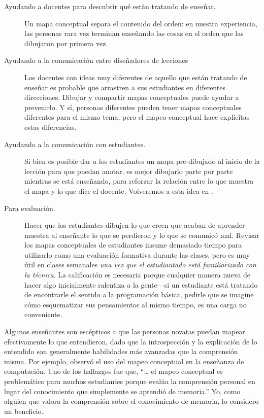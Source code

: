 \begin{description}

\item[Ayudando a docentes para descubrir qué están tratando de enseñar.]
  Un mapa conceptual separa el contenido del orden:
  en nuestra experiencia,
  las personas rara vez terminan enseñando las cosas en el orden que las dibujaron por primera vez.

\item[Ayudando a la comunicación entre diseñadores de lecciones]
  Los docentes con ideas muy diferentes de aquello que están tratando de enseñar es probable que arrastren a sus estudiantes en diferentes direcciones.
  Dibujar y compartir mapas conceptuales puede ayudar a prevenirlo.
  Y sí,
  personas diferentes pueden tener mapas conceptuales diferentes para el mismo tema,
  pero el mapeo conceptual hace explícitas estas diferencias.

\item[Ayudando a la  comunicación con estudiantes.]
  Si bien es posible dar a los estudiantes un mapa pre-dibujado al inicio de la lección para   que puedan anotar,
  es mejor dibujarlo parte por parte mientras se está enseñando,
  para reforzar la relación entre lo que muestra el mapa y lo que dice el docente.
  Volveremos a esta idea en .

\item[Para evaluación.]
  Hacer que los estudiantes dibujen lo que creen que acaban de aprender
  muestra al enseñante lo que se perdieron y lo que se comunicó mal.
  Revisar los mapas conceptuales de estudiantes insume demasiado tiempo para utilizarlo como una evaluación formativa durante las clases,
  pero es muy útil en clases semanales \emph{una vez que el estudiantado está familiarizado con la técnica}.
  La calificación es necesaria porque
  cualquier manera nueva de hacer algo inicialmente ralentiza a la gente---si un estudiante está tratando de encontrarle el sentido a la programación básica,
  pedirle que se imagine cómo esquematizar sus pensamientos al mismo tiempo, es una carga no conveniente.

\end{description}

Algunos enseñantes son escépticos a que las personas novatas puedan mapear efectivamente lo que entendieron,
dado que la introspección y la explicación de lo entendido son generalmente habilidades más avanzadas que la comprensión misma.
Por ejemplo,
\cite{Kepp2008} observó el uso del mapeo conceptual en la enseñanza de computación.
Uno de los hallazgos fue que,
``{\ldots} el mapeo conceptual es problemático para muchos estudiantes porque
evalúa la comprensión personal en lugar del conocimiento que simplemente se aprendió de memoria.''
Yo, como alguien que valora la comprensión sobre el conocimiento de memoria,
lo considero un beneficio.

